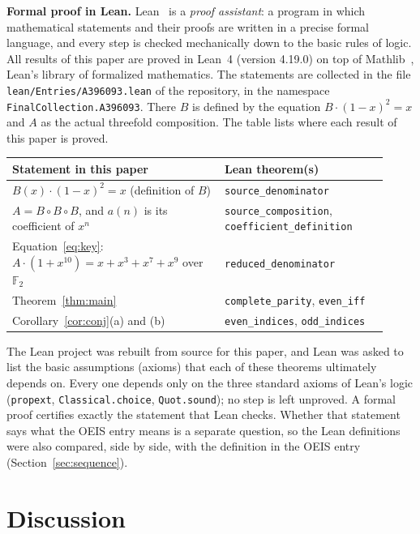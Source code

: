 \documentclass[11pt,a4paper]{article}
\theoremstyle{definition}
\theoremstyle{remark}
\newcommand{\F}{\mathbb{F}}
\newcommand{\para}[1]{\par\medskip\noindent\textbf{#1}\enspace}
\begin{document}
\para{Formal proof in Lean.}
Lean~\cite{lean} is a \emph{proof assistant}: a program in which mathematical statements and their proofs are written
in a precise formal language, and every step is checked mechanically down to the basic rules of logic. All results of
this paper are proved in Lean~4 (version 4.19.0) on top of Mathlib~\cite{mathlib}, Lean's library of formalized
mathematics. The statements are collected in the file \texttt{lean/Entries/A396093.lean} of the repository,
in the namespace \texttt{FinalCollection.A396093}. There $B$ is defined by the equation $B\cdot(1-x)^2=x$ and $A$ as the actual threefold composition.
The table lists where each result of this paper is proved.
\begin{center}\small\renewcommand{\arraystretch}{1.25}
\begin{tabular}{>{\raggedright\arraybackslash}p{0.52\linewidth}>{\raggedright\arraybackslash}p{0.4\linewidth}}
\toprule
Statement in this paper & Lean theorem(s)\\
\midrule
$B(x)\cdot(1-x)^2=x$ (definition of $B$) & \texttt{source\_\allowbreak{}denominator} \\
$A=B\circ B\circ B$, and $a(n)$ is its coefficient of $x^n$ & \texttt{source\_\allowbreak{}composition}, \texttt{coefficient\_\allowbreak{}definition} \\
Equation~\eqref{eq:key}: $A\cdot(1+x^{10})=x+x^3+x^7+x^9$ over $\F_2$ & \texttt{reduced\_\allowbreak{}denominator} \\
Theorem~\ref{thm:main} & \texttt{complete\_\allowbreak{}parity}, \texttt{even\_\allowbreak{}iff} \\
Corollary~\ref{cor:conj}(a) and (b) & \texttt{even\_\allowbreak{}indices}, \texttt{odd\_\allowbreak{}indices} \\
\bottomrule
\end{tabular}
\end{center}
The Lean project was rebuilt from source for this paper, and Lean was asked to list the basic assumptions (axioms)
that each of these theorems ultimately depends on. Every one depends only on the three standard axioms of Lean's logic
(\texttt{propext}, \texttt{Classical.choice}, \texttt{Quot.sound}); no step is left unproved. A formal proof certifies
exactly the statement that Lean checks. Whether that statement says what the OEIS entry means is a separate question,
so the Lean definitions were also compared, side by side, with the definition in the OEIS entry
(Section~\ref{sec:sequence}).

\section{Discussion}\label{sec:discussion}
\end{document}
